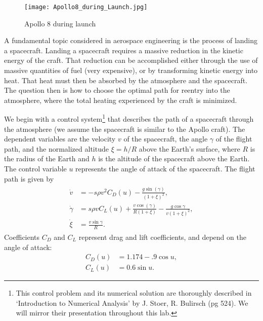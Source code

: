 \label{lab:reentry}

\begin{figure}
\centering
\texttt{[image: Apollo8\_during\_Launch.jpg]}
\caption{Apollo 8 during launch}
\label{fig:reentry:apollo8}
\end{figure}

A fundamental topic considered in aerospace engineering is the process of landing a spacecraft. 
Landing a spacecraft requires a massive reduction in the kinetic energy of the craft. 
That reduction can be accomplished either through the use of massive quantities of fuel (very expensive), or by  transforming kinetic energy into heat. 
That heat must then be absorbed by the atmosphere and the spacecraft. 
The question then is how to choose the optimal path for reentry into the atmosphere, where the total heating experienced by the craft is minimized. 

We begin with a control system\footnote{This control problem and its numerical solution are thoroughly described in `Introduction to Numerical Analysis' by J. Stoer, R. Bulirsch (pg 524). 
We will mirror their presentation throughout this lab.}
that describes the path of a spacecraft through the atmosphere 
(we assume the spacecraft is similar to the Apollo craft).
The dependent variables are the velocity $v$ of the spacecraft,  
the angle $\gamma$ of the flight path, 
and the normalized altitude $\xi=h/R$ above the Earth's surface, where $R$ is the radius of the Earth and $h$ is the altitude of the spacecraft above the Earth.
The control variable  $u$ represents the angle of attack of the spacecraft. 
The flight path is given by 
\begin{align}
\begin{split}
\dot{v} &= -s\rho v^2C_D(u) - \frac{g\sin(\gamma)}{(1+\xi)^2},\\
\dot{\gamma} &= s \rho v C_L(u) + \frac{v \cos(\gamma)}{R(1+\xi)} - \frac{g \cos \gamma}{v(1+\xi)^2},\\
\dot{\xi} &= \frac{v \sin \gamma}{R}.
\end{split} \label{eqn:reentry:control_system}
\end{align}
Coefficients $C_D$ and $C_L$ represent drag and lift coefficients, and depend on the angle of attack:
\begin{align*}
 C_D(u) &= 1.174 - .9\cos u, \\
 C_L(u) &= 0.6\sin u.
\end{align*}
 

